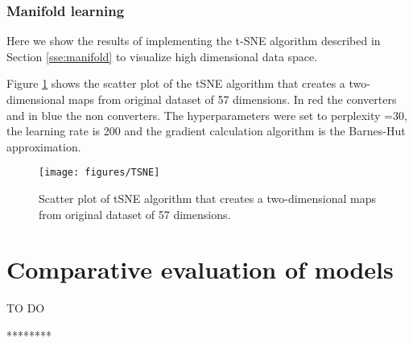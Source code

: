 \documentclass[11pt]{article}
\theoremstyle{definition}
\theoremstyle{remark}
\begin{document}
{\subsubsection{Manifold learning}
\label{sse:resmanifold}
Here we show the results of implementing the t-SNE algorithm described in Section \ref{sse:manifold} to visualize high dimensional data space.


Figure \ref{fig:TSNE} shows the scatter plot of the tSNE algorithm that creates a two-dimensional maps from original dataset of 57 dimensions. In red the converters and in blue the non converters. The hyperparameters were set to perplexity =30, the learning rate is 200 and the  gradient calculation algorithm is the Barnes-Hut approximation.

\begin{figure}[H] 
        \centering
        \texttt{[image: figures/TSNE]}
        \caption{Scatter plot of tSNE algorithm that creates a two-dimensional maps from original dataset of 57 dimensions. 
        } \label{fig:TSNE}
\end{figure}




\section{Comparative evaluation of models}
\label{se:compare}
TO DO

********

}
\end{document}
